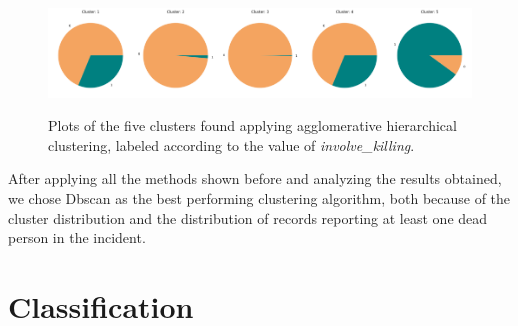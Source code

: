 \documentclass[10pt,a4paper]{report}
\begin{document}
\begin{figure}[h]
	\centering
	\includegraphics[width=0.2\textwidth]{hiera_1}\includegraphics[width=0.2\textwidth]{hiera_2}\includegraphics[width=0.2\textwidth]{hiera_3}\includegraphics[width=0.2\textwidth]{hiera_4}\includegraphics[width=0.2\textwidth]{hiera_5}
	\caption{Plots of the five clusters found applying agglomerative hierarchical clustering, labeled according to the value of \textit{involve\_killing}.}
	\label{hiera_killing}
\end{figure}

After applying all the methods shown before and analyzing the results obtained, we chose Dbscan as the best performing clustering algorithm, both because of the cluster distribution and the  distribution of records reporting at least one dead person in the incident.

\chapter{Classification}
\end{document}
